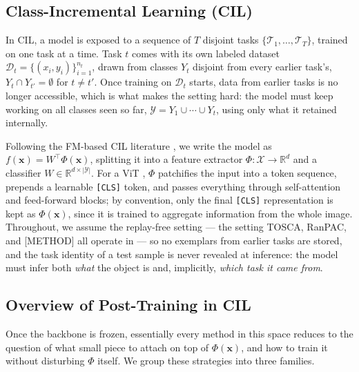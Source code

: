 \documentclass{article}
\begin{document}
\subsection{Class-Incremental Learning (CIL)}
\label{sec:background-cil}

In CIL, a model is exposed to a sequence of $T$ disjoint tasks
$\{\mathcal{T}_1, \ldots, \mathcal{T}_T\}$, trained on one task at a time.
Task $t$ comes with its own labeled dataset
$\mathcal{D}_t=\{(x_i,y_i)\}_{i=1}^{n_t}$, drawn from classes $Y_t$
disjoint from every earlier task's, $Y_t \cap Y_{t'}=\emptyset$ for $t \neq
t'$. Once training on $\mathcal{D}_t$ starts, data from earlier tasks is no
longer accessible, which is what makes the setting hard: the model must
keep working on all classes seen so far, $\mathcal{Y}=Y_1 \cup \cdots \cup
Y_t$, using only what it retained internally.

Following the FM-based CIL literature
\citep{wang2022learning,wang2022dualprompt,smith2023coda,zhou2024revisiting,zhou2024expandable,sun2025mos},
we write the model as $f(\mathbf{x}) = W^\top \Phi(\mathbf{x})$, splitting
it into a feature extractor $\Phi: \mathcal{X} \to \mathbb{R}^d$ and a
classifier $W \in \mathbb{R}^{d \times |\mathcal{Y}|}$. For a ViT
\citep{dosovitskiy2021image}, $\Phi$ patchifies the input into a token
sequence, prepends a learnable \texttt{[CLS]} token, and passes everything
through self-attention and feed-forward blocks; by convention, only the
final \texttt{[CLS]} representation is kept as $\Phi(\mathbf{x})$, since it
is trained to aggregate information from the whole image. Throughout, we
assume the replay-free setting
\citep{wang2022learning,wang2022dualprompt,smith2023coda,zhou2024revisiting,zhou2024expandable}
--- the setting TOSCA, RanPAC, and [METHOD] all operate in --- so no
exemplars from earlier tasks are stored, and the task identity of a test
sample is never revealed at inference: the model must infer both
\emph{what} the object is and, implicitly, \emph{which task it came from}.

\subsection{Overview of Post-Training in CIL}
\label{sec:background-posttraining}

Once the backbone is frozen, essentially every method in this space reduces
to the question of what small piece to attach on top of $\Phi(\mathbf{x})$,
and how to train it without disturbing $\Phi$ itself. We group these
strategies into three families.
\end{document}
